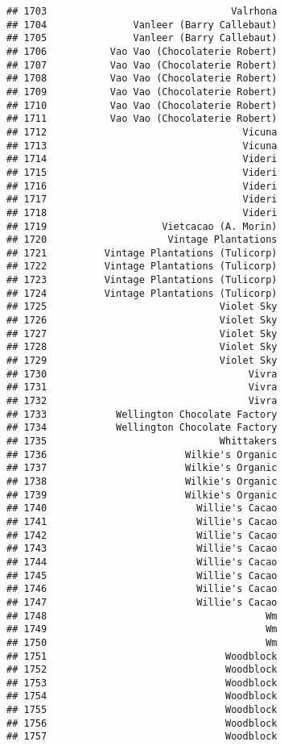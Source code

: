 \documentclass[
]{article}
\begin{document}
\begin{verbatim}
## 1703                                Valrhona
## 1704               Vanleer (Barry Callebaut)
## 1705               Vanleer (Barry Callebaut)
## 1706           Vao Vao (Chocolaterie Robert)
## 1707           Vao Vao (Chocolaterie Robert)
## 1708           Vao Vao (Chocolaterie Robert)
## 1709           Vao Vao (Chocolaterie Robert)
## 1710           Vao Vao (Chocolaterie Robert)
## 1711           Vao Vao (Chocolaterie Robert)
## 1712                                  Vicuna
## 1713                                  Vicuna
## 1714                                  Videri
## 1715                                  Videri
## 1716                                  Videri
## 1717                                  Videri
## 1718                                  Videri
## 1719                    Vietcacao (A. Morin)
## 1720                     Vintage Plantations
## 1721          Vintage Plantations (Tulicorp)
## 1722          Vintage Plantations (Tulicorp)
## 1723          Vintage Plantations (Tulicorp)
## 1724          Vintage Plantations (Tulicorp)
## 1725                              Violet Sky
## 1726                              Violet Sky
## 1727                              Violet Sky
## 1728                              Violet Sky
## 1729                              Violet Sky
## 1730                                   Vivra
## 1731                                   Vivra
## 1732                                   Vivra
## 1733            Wellington Chocolate Factory
## 1734            Wellington Chocolate Factory
## 1735                              Whittakers
## 1736                        Wilkie's Organic
## 1737                        Wilkie's Organic
## 1738                        Wilkie's Organic
## 1739                        Wilkie's Organic
## 1740                          Willie's Cacao
## 1741                          Willie's Cacao
## 1742                          Willie's Cacao
## 1743                          Willie's Cacao
## 1744                          Willie's Cacao
## 1745                          Willie's Cacao
## 1746                          Willie's Cacao
## 1747                          Willie's Cacao
## 1748                                      Wm
## 1749                                      Wm
## 1750                                      Wm
## 1751                               Woodblock
## 1752                               Woodblock
## 1753                               Woodblock
## 1754                               Woodblock
## 1755                               Woodblock
## 1756                               Woodblock
## 1757                               Woodblock

\end{verbatim}
\end{document}
